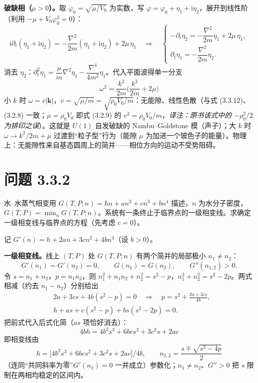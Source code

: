 \textbf{破缺相（$\mu>0$）。}取 $\varphi_0=\sqrt{\mu/V_0}$ 为实数，写 $\varphi=\varphi_0+\eta_1+\mathrm{i}\eta_2$，展开到线性阶（利用 $-\mu+V_0\varphi_0^{2}=0$）：
\begin{equation*}
\mathrm{i}\partial_t(\eta_1+\mathrm{i}\eta_2)
=-\frac{\nabla^{2}}{2m}(\eta_1+\mathrm{i}\eta_2)+2\mu\,\eta_1
\quad\Longrightarrow\quad
\begin{cases}
-\partial_t\eta_2=-\dfrac{\nabla^{2}}{2m}\eta_1+2\mu\,\eta_1,\\[6pt]
\partial_t\eta_1=-\dfrac{\nabla^{2}}{2m}\eta_2 .
\end{cases}
\end{equation*}
消去 $\eta_2$：$\partial_t^{2}\eta_1=\dfrac{\mu}{m}\nabla^{2}\eta_1-\dfrac{\nabla^{4}}{4m^{2}}\eta_1$。代入平面波得单一分支
\begin{equation*}
\boxed{\;\omega^{2}=\frac{k^{2}}{2m}\Big(\frac{k^{2}}{2m}+2\mu\Big)\;}
\end{equation*}
小 $k$ 时 $\omega=v|\pmb{k}|$，$v=\sqrt{\mu/m}=\sqrt{\rho_0V_0/m}$：无能隙、线性色散（与式 (3.3.12)、(3.2.8) 一致；$\mu=\rho_0V_0$ 即式 (3.2.9) 的 $v^{2}=\rho_0V_0/m$，\emph{译注：原书该式中的 $-\rho_0^2/2$ 为排印之误}）。这就是 $U(1)$ 自发破缺的 Nambu--Goldstone 模（声子）；大 $k$ 时 $\omega\to k^{2}/2m+\mu$ 过渡到“粒子型”行为（能隙 $\mu$ 为加进一个玻色子的能量）。物理上：无能隙性来自基态圆周上的简并——相位方向的运动不受势阻碍。

\section*{问题 3.3.2}
\begin{problem}
水--水蒸气相变用 $G(T,P;n)=hn+an^{2}+cn^{3}+bn^{4}$ 描述，$n$ 为水分子密度，$G(T,P)=\min_n G(T,P;n)$。系统有一条终止于临界点的一级相变线。求确定一级相变线与临界点的方程（先考虑 $c=0$）。
\end{problem}
\solution

记 $G'(n)=h+2an+3cn^{2}+4bn^{3}$（设 $b>0$）。

\textbf{一级相变线。}线上 $(T,P)$ 处 $G(T,P;n)$ 有两个简并的局部极小 $n_1\neq n_2$：
\begin{equation*}
G'(n_1)=G'(n_2)=0,\qquad G(n_1)=G(n_2),\qquad G''(n_{1,2})>0 .
\end{equation*}
令 $s=n_1+n_2$，$p=n_1n_2$，则 $n_1^2+n_1n_2+n_2^2=s^{2}-p$，$n_1^{2}+n_2^{2}=s^{2}-2p$。两式相减（约去 $n_1-n_2$）分别给出
\begin{align*}
&2a+3cs+4b(s^{2}-p)=0
\quad\Longrightarrow\quad
p=s^{2}+\frac{2a+3cs}{4b},\\
&h+as+c(s^{2}-p)+bs(s^{2}-2p)=0 .
\end{align*}
把前式代入后式化简（$as$ 项恰好消去）：
\begin{equation*}
\boxed{\;4bh=4b^{2}s^{3}+6bcs^{2}+3c^{2}s+2ac\;}
\end{equation*}
即相变线由
\begin{equation*}
h=\Big[4b^{2}s^{3}+6bcs^{2}+3c^{2}s+2ac\Big]\Big/4b,
\qquad
n_{1,2}=\frac{s\mp\sqrt{s^{2}-4p}}{2}
\end{equation*}
（连同“共同斜率为零”$G'(n_1)=0$ 一并成立）参数化；$n_1\neq n_2$、$G''>0$ 把 $s$ 限制在两相均稳定的区间内。


